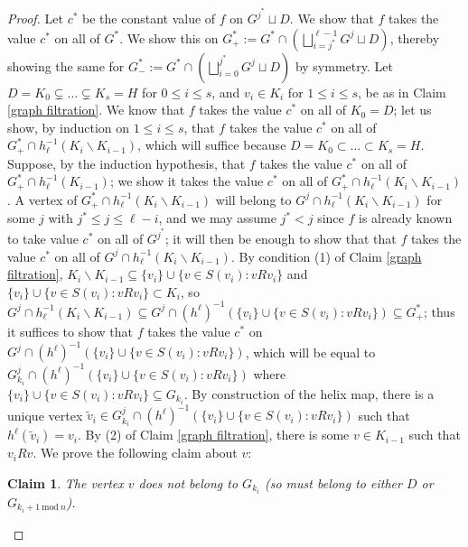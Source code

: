 \documentclass{amsart}
\newtheorem{claim}[theorem]{Claim}
\theoremstyle{definition}
\theoremstyle{remark}
\numberwithin{equation}{section}
\begin{document}
\begin{proof}
Let $c^{*}$ be the constant value of $f$ on $G^{j^{*}} \sqcup D$. We show that $f$ takes the value $c^{*}$ on all of $G^{*}$. We show this on $G_{+}^{*}:= G^{*} \cap( \bigsqcup^{\ell-1}_{i = j^{*}} G^{j} \sqcup D)$, thereby showing the same for $G_{-}^{*}:= G^{*} \cap (\bigsqcup^{j^{*}}_{i = 0} G^{j} \sqcup D)$ by symmetry. Let $D = K_{0} \subsetneq \ldots \subsetneq K_{s} = H$ for $0 \leq i \leq s$, and $v_{i} \in K_{i}$ for $1 \leq i \leq s$, be as in Claim \ref{graph filtration}.  We know that $f$ takes the value $c^{*}$ on all of $K_{0} = D$; let us show, by induction on $1 \leq i \leq s$, that $f$ takes the value $c^{*}$ on all of $G^{*}_{+} \cap h^{-1}_{\ell}(K_{i} \backslash K_{i-1})$, which will suffice because $D = K_{0} \subset \ldots \subset K_{s} = H$. Suppose, by the induction hypothesis, that $f$ takes the value $c^{*}$ on all of $G^{*}_{+} \cap h^{-1}_{\ell}(K_{i-1})$; we show it takes the value $c^{*}$ on all of $G^{*}_{+} \cap h^{-1}_{\ell}(K_{i} \backslash K_{i-1})$. A vertex of $G^{*}_{+} \cap h^{-1}_{\ell}(K_{i} \backslash K_{i-1})$ will belong to $G^{j} \cap h^{-1}_{\ell}(K_{i} \backslash K_{i-1})$ for some $j$ with $j^{*} \leq j \leq \ell-i$, and we may assume $j^{*} < j$ since $f$ is already known to take value $c^{*}$ on all of $G^{j^{*}}$; it will then be enough to show that that $f$ takes the value $c^{*}$ on all of $G^{j} \cap h^{-1}_{\ell}(K_{i} \backslash K_{i-1})$. By condition (1) of Claim \ref{graph filtration}, $K_{i} \backslash K_{i-1} \subseteq \{v_{i}\} \cup \{v\in S(v_{i}): vRv_{i}\}$ and $\{v_{i}\} \cup \{v\in S(v_{i}): vRv_{i}\} \subset K_{i}$, so $G^{j} \cap h^{-1}_{\ell}(K_{i} \backslash K_{i-1}) \subseteq G^{j} \cap (h^{\ell})^{-1}(\{v_{i}\} \cup \{v\in S(v_{i}): vRv_{i}\}) \subseteq G^{*}_{+}$; thus it suffices to show that $f$ takes the value $c^{*}$ on $G^{j} \cap (h^{\ell})^{-1}(\{v_{i}\} \cup \{v\in S(v_{i}): vRv_{i}\})$, which will be equal to $G_{k_{i}}^{j} \cap (h^{\ell})^{-1}(\{v_{i}\} \cup \{v\in S(v_{i}): vRv_{i}\})$ where $\{v_{i}\} \cup \{v\in S(v_{i}): vRv_{i}\} \subseteq G_{k_{i}}$. By construction of the helix map, there is a unique vertex $\tilde{v}_{i} \in G_{k_{i}}^{j} \cap (h^{\ell})^{-1}(\{v_{i}\} \cup \{v\in S(v_{i}): vRv_{i}\})$ such that $h^{\ell}(\tilde{v}_{i}) = v_{i}$. By (2) of Claim \ref{graph filtration}, there is some $v \in K_{i-1}$ such that $v_{i} R v$. We prove the following claim about $v$:

\begin{claim}\label{pointing outside of component}
    The vertex $v$ does not belong to $G_{k_{i}}$ (so must belong to either $D$ or $G_{k_{i}+1 \mathrm{\:mod\:} n}$).
\end{claim}


\end{proof}
\end{document}
